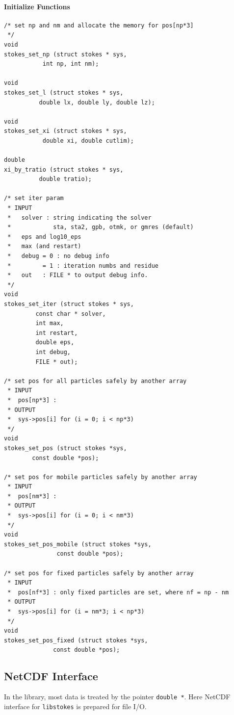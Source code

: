 \documentclass{book}
\begin{document}
\paragraph{Initialize Functions}
\begin{verbatim}
/* set np and nm and allocate the memory for pos[np*3]
 */
void
stokes_set_np (struct stokes * sys,
	       int np, int nm);

void
stokes_set_l (struct stokes * sys,
	      double lx, double ly, double lz);

void
stokes_set_xi (struct stokes * sys,
	       double xi, double cutlim);

double
xi_by_tratio (struct stokes * sys,
	      double tratio);

/* set iter param
 * INPUT
 *   solver : string indicating the solver
 *            sta, sta2, gpb, otmk, or gmres (default)
 *   eps and log10_eps
 *   max (and restart)
 *   debug = 0 : no debug info
 *         = 1 : iteration numbs and residue
 *   out   : FILE * to output debug info.
 */
void
stokes_set_iter (struct stokes * sys,
		 const char * solver,
		 int max,
		 int restart,
		 double eps,
		 int debug,
		 FILE * out);

/* set pos for all particles safely by another array
 * INPUT
 *  pos[np*3] :
 * OUTPUT
 *  sys->pos[i] for (i = 0; i < np*3)
 */
void
stokes_set_pos (struct stokes *sys,
		const double *pos);

/* set pos for mobile particles safely by another array
 * INPUT
 *  pos[nm*3] :
 * OUTPUT
 *  sys->pos[i] for (i = 0; i < nm*3)
 */
void
stokes_set_pos_mobile (struct stokes *sys,
		       const double *pos);

/* set pos for fixed particles safely by another array
 * INPUT
 *  pos[nf*3] : only fixed particles are set, where nf = np - nm
 * OUTPUT
 *  sys->pos[i] for (i = nm*3; i < np*3)
 */
void
stokes_set_pos_fixed (struct stokes *sys,
		      const double *pos);
\end{verbatim}

\subsection{NetCDF Interface}
In the library, most data is treated by the pointer
{\tt double *}. Here NetCDF interface for {\tt libstokes}
is prepared for file I/O.
\end{document}
